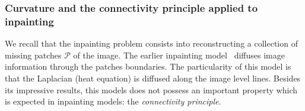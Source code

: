 \subsubsection{Curvature and the connectivity principle applied to inpainting}

We recall that the inpainting problem consists into reconstructing a collection of missing patches $\mathcal{P}$ of the image. The earlier inpainting model~\cite{bertalmio00image}  diffuses image information through the patches boundaries. The particularity of this model is that the Laplacian (heat equation) is diffused along the image level lines. Besides its impressive results, this models does not possess an important property which is expected in inpainting models: the \emph{connectivity principle}.


\begin{figure}
\center
{}\hspace{3em}
\end{figure}
